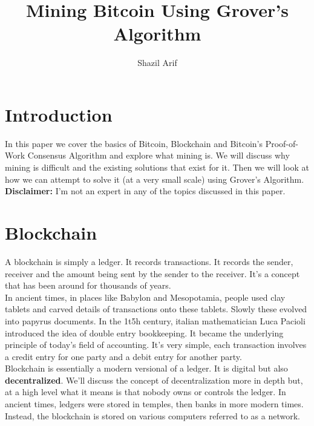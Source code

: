 \documentclass[11pt]{article} %
\title{Mining Bitcoin Using Grover's Algorithm}
\author{Shazil Arif}
\begin{document}
\maketitle

\tableofcontents

\section{Introduction}{}

In this paper we cover the basics of Bitcoin, Blockchain and Bitcoin's Proof-of-Work Consensus Algorithm and explore what mining is. We will discuss why mining is difficult and the existing solutions that exist for it. Then we will look at how we can attempt to solve it (at a very small scale) using Grover's Algorithm.\\


\noindent \textbf{Disclaimer:} I'm not an expert in any of the topics discussed in this paper.

\section{Blockchain}{}

A blockchain is simply a ledger. It records transactions. It records the sender, receiver and the amount being sent by the sender to the receiver. It's a concept that has been around for thousands of years.\\

\noindent In ancient times, in places like Babylon and Mesopotamia, people used clay tablets and carved details of transactions onto these tablets. Slowly these evolved into papyrus documents. In the 1t5h century, italian mathematician Luca Pacioli introduced the idea of double entry bookkeeping. It became the underlying principle of today's field of accounting. It's very simple, each transaction involves a credit entry for one party and a debit entry for another party.\\

\noindent Blockchain is essentially a modern versional of a ledger. It is digital but also \textbf{decentralized}. We'll discuss the concept of decentralization more in depth but, at a high level what it means is that nobody owns or controls the ledger. In ancient times, ledgers were stored in temples, then banks in more modern times. Instead, the blockchain is stored on various computers referred to as a network.\\
\end{document}
